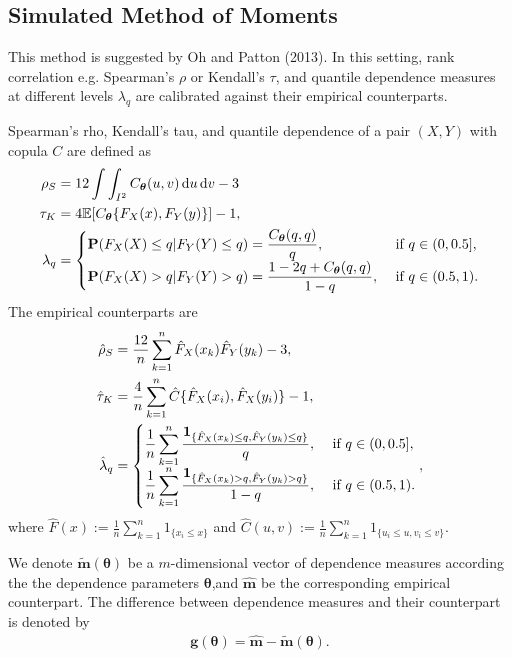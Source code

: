 

\subsection{Simulated Method of Moments}
This method is suggested by Oh and Patton (2013).
In this setting, rank correlation e.g. Spearman's $\rho$ or Kendall's $\tau$,
and quantile dependence measures at different levels $\lambda_q$
are calibrated against their empirical counterparts.

Spearman's rho, Kendall's tau, and quantile dependence of a pair $(X,Y)$
with copula $C$ are defined as
\begin{align}
  \rho_S &= 12 \int\int_{I^2} C_{\bm{\theta}}(u,v)\, {\rm d} u\, {\rm d} v-3\label{eq:rho_S}\\
  \tau_K &= 4\mathbb{E}[C_{\bm{\theta}}\{F_X(x), F_Y(y)\}]-1,\\
  \lambda_q &=
  \begin{cases}
    {\bf P}(F_X(X)\leq q| F_Y(Y)\leq q) = \displaystyle \frac{C_{\bm{\theta}}(q,q)}{q},
    &\text{ if } q\in (0,0.5],\\
    {\bf P}(F_X(X)>q|F_Y(Y)>q) =\displaystyle \frac{1-2q+C_{\bm{\theta}}(q,q)} {1-q},
    &\text{ if } q\in (0.5,1).
  \end{cases}
\end{align}
The empirical counterparts are
\begin{align*}
  \hat\rho_S &= \frac{12}{n} \sum_{k=1}^n \hat F_X(x_k) \hat F_Y(y_k)
               -3,\\
  \hat\tau_K &= \frac{4}{n}\sum_{k=1}^n \hat{C}\{\hat{F}_X(x_i),\hat{F}_X(y_i)\} -1 ,\\
  \hat\lambda_q &=
                  \begin{cases}
                    \displaystyle\frac{1}{n} \sum_{k=1}^n \frac{\textbf{1}_{\{\hat
                        F_X(x_k)\leq q, \hat F_Y(y_k)\leq q\}}} {q},
                    &\text { if } q\in (0, 0.5],\\
                    \displaystyle \frac{1}{n} \sum_{k=1}^n
                    \frac{\textbf{1}_{\{\hat F_X(x_k)>q, \hat F_Y(y_k)>q\}}}
                    {1-q}, &\text { if } q\in (0.5,1).
                  \end{cases},
\end{align*}
where $\hat{F}(x) := \frac{1}{n}\sum_{k=1}^n 1_{\{x_i\leq x\}}$ and
$\hat{C}(u,v) := \frac{1}{n}\sum_{k=1}^n 1_{\{u_i\leq u, v_i\leq v\}}$.


We denote $\tilde{\bm{m}}(\bm{\theta})$ be a $m$-dimensional vector of dependence measures according the the
dependence parameters $\bm{\theta}$,and  $\hat{\bm{m}}$ be the corresponding empirical counterpart.
The difference between dependence measures and their counterpart is denoted by
\begin{align*}
    \bm{g}(\bm{\theta}) = \hat{\bm{m}} - \tilde{\bm{m}}(\bm{\theta}).
\end{align*}

